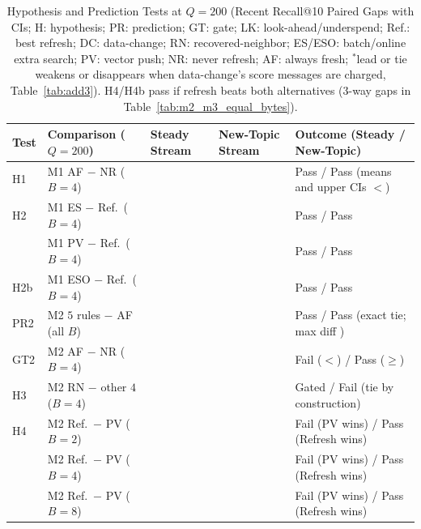 \begin{table}[!t]
\centering
\caption{Hypothesis and Prediction Tests at $Q = 200$ (Recent Recall@10 Paired Gaps with \RNumCIPct{} CIs; H: hypothesis; PR: prediction; GT: gate; LK: look-ahead/underspend; Ref.: best refresh; DC: data-change; RN: recovered-neighbor; ES/ESO: batch/online extra search; PV: vector push; NR: never refresh; AF: always fresh; $^{\ast}$lead or tie weakens or disappears when data-change's score messages are charged, Table~\ref{tab:add3}). H4/H4b pass if refresh beats both alternatives (3-way gaps in Table~\ref{tab:m2_m3_equal_bytes}).}
\label{tab:hypotheses}
\scriptsize
\renewcommand{\arraystretch}{0.68}
\setlength{\tabcolsep}{1.0pt}
\begin{tabular}{@{}lllll@{}}
\toprule
\textbf{Test} & \textbf{Comparison ($Q{=}200$)} & \textbf{Steady Stream} & \textbf{New-Topic Stream} & \textbf{Outcome (Steady / New-Topic)} \\
\midrule
H1 & M1 AF $-$ NR ($B{=}4$) & \RNumHOneGapSteady{} & \RNumHOneGapNewTopic{} & Pass / Pass (means and upper CIs $< {}$\RNumGateThresholdPP{}) \\
H2 & M1 ES $-$ Ref.\ ($B{=}4$) & \RNumHTwoESvsRefreshSteady{} & \RNumHTwoESvsRefreshNewTopic{} & Pass / Pass \\
 & M1 PV $-$ Ref.\ ($B{=}4$) & \RNumHTwoPVvsRefreshSteady{} & \RNumHTwoPVvsRefreshNewTopic{} & Pass / Pass \\
H2b & M1 ESO $-$ Ref.\ ($B{=}4$) & \RNumHTwoBESOvsRefreshSteady{} & \RNumHTwoBESOvsRefreshNewTopic{} & Pass / Pass \\
PR2 & M2 $5$ rules $-$ AF (all $B$) & \RNumPredMTwoTiesGap{} & \RNumPredMTwoTiesGap{} & Pass / Pass (exact tie; max diff \RNumPredMTwoTiesMaxAbs{}) \\
GT2 & M2 AF $-$ NR ($B{=}4$) & \RNumGateMTwoSteady{} & \RNumGateMTwoNewTopic{} & Fail ($< {}$\RNumGateThresholdPP{}) / Pass ($\ge {}$\RNumGateThresholdPP{}) \\
H3 & M2 RN $-$ other $4$ ($B{=}4$) & \RNumHThreeGapZero{} & \RNumHThreeGapZero{} & Gated / Fail (tie by construction) \\
H4 & M2 Ref.\ $-$ PV ($B{=}2$) & \RNumHFourRefMinusPVBTwoSteady{} & \RNumHFourRefMinusPVBTwoNewTopic{} & Fail (PV wins) / Pass (Refresh wins) \\
 & M2 Ref.\ $-$ PV ($B{=}4$) & \RNumHFourRefMinusPVBFourSteady{} & \RNumHFourRefMinusPVBFourNewTopic{} & Fail (PV wins) / Pass (Refresh wins) \\
 & M2 Ref.\ $-$ PV ($B{=}8$) & \RNumHFourRefMinusPVBEightSteady{} & \RNumHFourRefMinusPVBEightNewTopic{} & Fail (PV wins) / Pass (Refresh wins) \\

\end{tabular}
\end{table}
